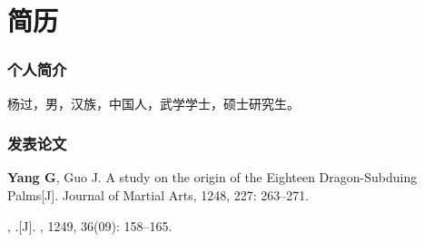 
\chapter{简历}
\subsection*{个人简介}
杨过，男，汉族，中国人，武学学士，硕士研究生。

\subsection*{发表论文}
\begin{small}   
\noindent [1] \textbf{Yang G}, Guo J. A study on the origin of the Eighteen Dragon-Subduing Palms[J]. Journal of Martial Arts, 1248, 227: 263–271.

\noindent [2] , .[J]. , 1249, 36(09): 158–165.
\end{small}
